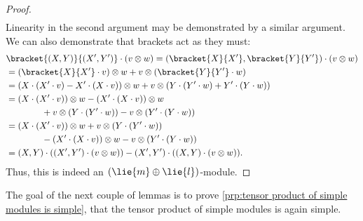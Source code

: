 \documentclass[fleqn]{NotesClass}
\begin{document}
\begin{lma}{}{}
\begin{proof}
\begin{align}
            \end{align}
            Linearity in the second argument may be demonstrated by a similar argument.
            We can also demonstrate that brackets act as they must:
            \begin{align}
                &\bracket{(X, Y)}{(X', Y')} \cdot (v \otimes w) = (\bracket{X}{X'}, \bracket{Y}{Y'}) \cdot (v \otimes w)\\
                &= (\bracket{X}{X'} \cdot v) \otimes w + v \otimes (\bracket{Y}{Y'} \cdot w)\\
                &= (X \cdot (X' \cdot v) - X' \cdot (X \cdot v)) \otimes w + v \otimes (Y \cdot (Y' \cdot w) + Y' \cdot (Y \cdot w)) \notag\\
                &= (X \cdot (X' \cdot v)) \otimes w - (X' \cdot (X \cdot v)) \otimes w\\
                &\qquad\qquad+ v \otimes (Y \cdot (Y' \cdot w)) - v \otimes (Y' \cdot (Y \cdot w)) \notag\\
                &= (X \cdot (X' \cdot v)) \otimes w + v \otimes (Y \cdot (Y' \cdot w))\\
                &\qquad\qquad- (X' \cdot (X \cdot v)) \otimes w - v \otimes (Y' \cdot (Y \cdot w)) \notag\\
                &= (X, Y) \cdot ((X', Y') \cdot (v \otimes w)) - (X', Y') \cdot ((X, Y) \cdot (v \otimes w)).\notag
            \end{align}
            Thus, this is indeed an \((\lie{m} \oplus \lie{l})\)-module.
        \end{proof}
    \end{lma}
    
    The goal of the next couple of lemmas is to prove \cref{prp:tensor product of simple modules is simple}, that the tensor product of simple modules is again simple.
    
\end{document}
